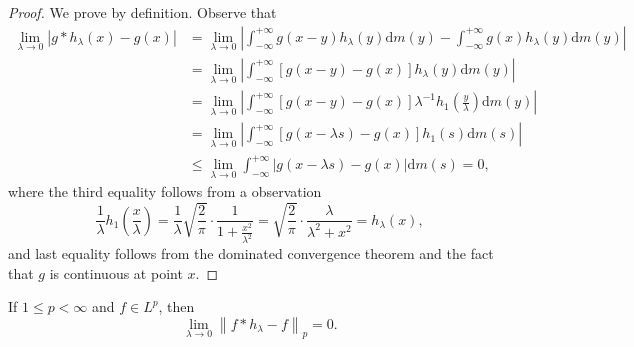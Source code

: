 \begin{proof}
We prove by definition. Observe that 
$$
\begin{aligned}
\lim_{\lambda \rightarrow 0} \left| g*h_{\lambda}\left( x \right) -g\left( x \right) \right|&=\lim_{\lambda \rightarrow 0} \left| \int_{-\infty}^{+\infty}{g\left( x-y \right) h_{\lambda}\left( y \right) \mathrm{d}m\left( y \right)}-\int_{-\infty}^{+\infty}{g\left( x \right) h_{\lambda}\left( y \right) \mathrm{d}m\left( y \right)} \right|
\\
&=\lim_{\lambda \rightarrow 0} \left| \int_{-\infty}^{+\infty}{\left[ g\left( x-y \right) -g\left( x \right) \right] h_{\lambda}\left( y \right) \mathrm{d}m\left( y \right)} \right|
\\
&=\lim_{\lambda \rightarrow 0} \left| \int_{-\infty}^{+\infty}{\left[ g\left( x-y \right) -g\left( x \right) \right] \lambda ^{-1}h_1\left( \frac{y}{\lambda} \right) \mathrm{d}m\left( y \right)} \right|
\\
&=\lim_{\lambda \rightarrow 0} \left| \int_{-\infty}^{+\infty}{\left[ g\left( x-\lambda s \right) -g\left( x \right) \right] h_1\left( s \right) \mathrm{d}m\left( s \right)} \right|
\\
&\le \lim_{\lambda \rightarrow 0} \int_{-\infty}^{+\infty}{\left| g\left( x-\lambda s \right) -g\left( x \right) \right|\mathrm{d}m\left( s \right)}=0,
\end{aligned}
$$
where the third equality follows from a observation 
$$
\frac{1}{\lambda}h_1\left( \frac{x}{\lambda} \right) =\frac{1}{\lambda}\sqrt{\frac{2}{\pi}}\cdot \frac{1}{1+\frac{x^2}{\lambda ^2}}=\sqrt{\frac{2}{\pi}}\cdot \frac{\lambda}{\lambda ^2+x^2}=h_{\lambda}\left( x \right) ,
$$
and last equality follows from the dominated convergence theorem and the fact that $g$ is continuous at point $x$.
\end{proof}
\begin{theorem}
If $1\le p<\infty$ and $f\in L^p$, then 
$$
\lim_{\lambda \rightarrow 0} \left\| f*h_{\lambda}-f \right\| _p=0.
$$
\end{theorem}
